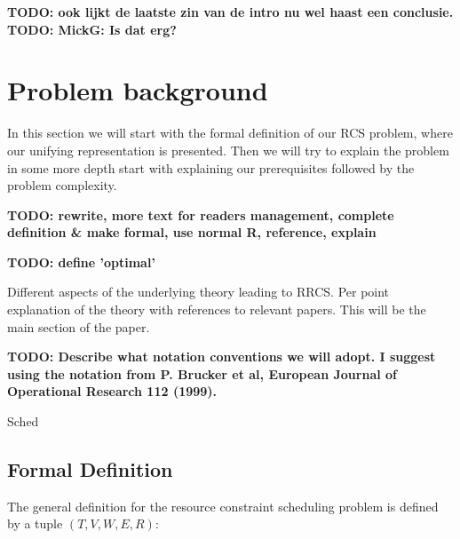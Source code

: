 \documentclass{article}
\newcommand{\TODO}[1]{{\color{red}\textbf{TODO: #1}}}
\begin{document}
\TODO{ook lijkt de laatste zin van de intro nu wel haast een conclusie.}
\TODO{MickG: Is dat erg?}

\newpage

\section{Problem background}
In this section we will start with the formal definition of our RCS problem, where our unifying representation is presented.
Then we will try to explain the problem in some more depth start with explaining our prerequisites followed by the problem complexity.

\TODO{rewrite, more text for readers management, complete definition \& make formal, use normal R, reference, explain}

\TODO{define 'optimal'}

Different aspects of the underlying theory leading to RRCS.
 Per point explanation of the theory with references to relevant papers.
This will be the main section of the paper.

\TODO{Describe what notation conventions we will adopt.
I suggest using the notation from P. Brucker et al, European Journal of Operational Research 112 (1999). }

Sched
\subsection{Formal Definition}
The general definition for the resource constraint scheduling problem is defined by a tuple $(T, V, W, E, R)$: \cite{brucker99}
\end{document}
